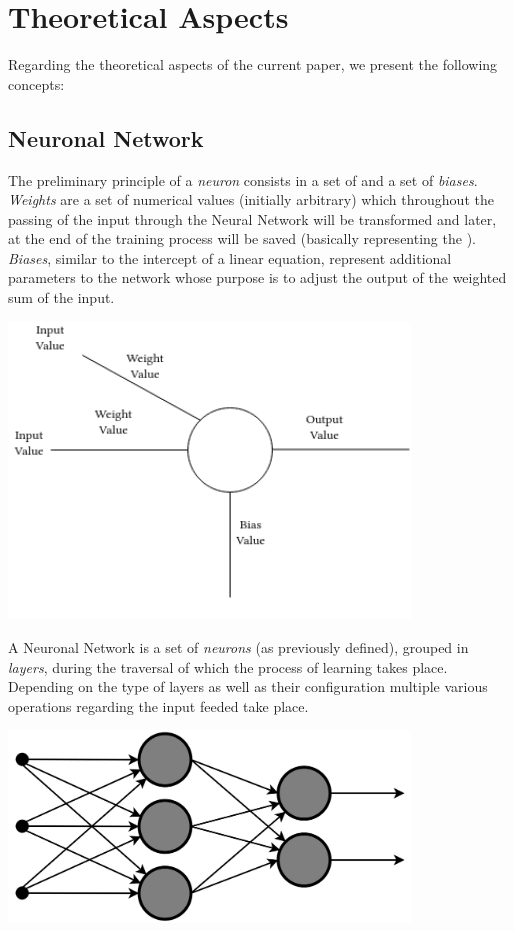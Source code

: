 \chapter{Theoretical Aspects}

Regarding the theoretical aspects of the current paper, we present the following concepts:
\section{Neuronal Network}
The preliminary principle of a \textit{neuron} consists in a set of  and a set of \textit{biases}.
\textit{Weights} are a set of numerical values (initially arbitrary) which throughout the passing
of the input through the Neural Network will be transformed and later, at the end of the training
process will be saved (basically representing the ).
\textit{Biases}, similar to the intercept of a linear equation, represent additional parameters to the network whose
purpose is to adjust the output of the weighted sum of the input.

\begin{center}
	\includegraphics[width = 4.2in]{images/genericneuron.png}
	\centerline{}
\label{neuron}
\end{center}

A Neuronal Network is a set of \textit{neurons} (as previously defined), grouped in \textit{layers},
during the traversal of which the process of learning takes place.
Depending on the type of layers as well as their configuration multiple various operations regarding the input feeded take
place.

\begin{center}
	\includegraphics[width = 4.2in]{images/genericnn.png}
	\centerline{}
\label{nn}
\end{center}



